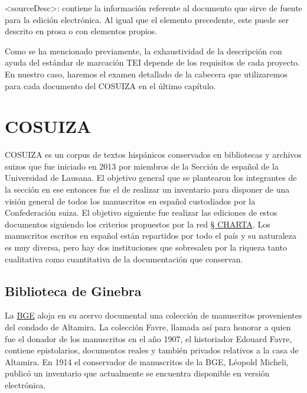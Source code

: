 \documentclass[
]{book}
\begin{document}
{ \textless sourceDesc\textgreater{}}: contiene la información referente al documento que sirve de fuente para la edición electrónica. Al igual que el elemento precedente, este puede ser descrito en prosa o con elementos propios.

Como se ha mencionado previamente, la exhaustividad de la descripción con ayuda del estándar de marcación TEI depende de los requisitos de cada proyecto. En nuestro caso, haremos el examen detallado de la cabecera que utilizaremos para cada documento del COSUIZA en el último capítulo.

\hypertarget{cosuiza}{%
\chapter*{COSUIZA}\label{cosuiza}}

COSUIZA es un corpus de textos hispánicos conservados en bibliotecas y archivos suizos que fue iniciado en 2013 por miembros de la Sección de español de la Universidad de Lausana. El objetivo general que se plantearon los integrantes de la sección en ese entonces fue el de realizar un inventario para disponer de una visión general de todos los manuscritos en español custodiados por la Confederación suiza. El objetivo siguiente fue realizar las ediciones de estos documentos siguiendo los criterios propuestos por la red \protect\hyperlink{charta}{§ CHARTA}.
Los manuscritos escritos en español están repartidos por todo el país y su naturaleza es muy diversa, pero hay dos instituciones que sobresalen por la riqueza tanto cualitativa como cuantitativa de la documentación que conservan.

\hypertarget{biblioteca-de-ginebra}{%
\section*{Biblioteca de Ginebra}\label{biblioteca-de-ginebra}}

La \href{http://institutions.ville-geneve.ch/en/bibliotheque-de-geneve/}{BGE} aloja en su acervo documental una colección de manuscritos provenientes del condado de Altamira. La colección Favre, llamada así para honorar a quien fue el donador de los manuscritos en el año 1907, el historiador Edouard Favre, contiene epistolarios, documentos reales y también privados relativos a la casa de Altamira. En 1914 el conservador de manuscritos de la BGE, Léopold Micheli, publicó un inventario que actualmente se encuentra disponible en versión electrónica.
\end{document}
